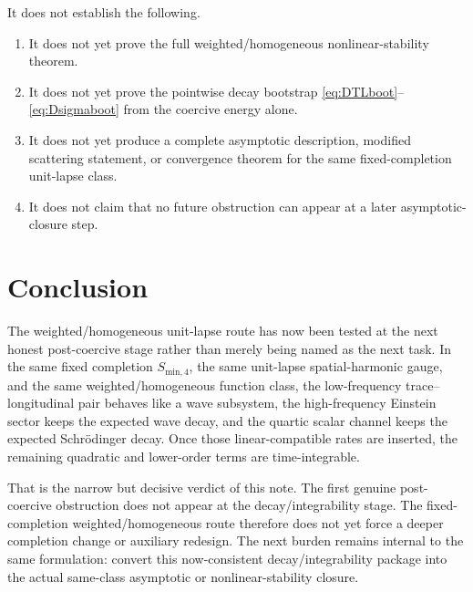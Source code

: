 \documentclass[11pt]{article}
\begin{document}
It does not establish the following.
\begin{enumerate}
    \item It does not yet prove the full weighted/homogeneous nonlinear-stability theorem.
    \item It does not yet prove the pointwise decay bootstrap \eqref{eq:DTLboot}--\eqref{eq:Dsigmaboot} from the coercive energy alone.
    \item It does not yet produce a complete asymptotic description, modified scattering statement, or convergence theorem for the same fixed-completion unit-lapse class.
    \item It does not claim that no future obstruction can appear at a later asymptotic-closure step.
\end{enumerate}

\section{Conclusion}

The weighted/homogeneous unit-lapse route has now been tested at the next honest post-coercive stage rather than merely being named as the next task. In the same fixed completion \(S_{\mathrm{min},4}\), the same unit-lapse spatial-harmonic gauge, and the same weighted/homogeneous function class, the low-frequency trace--longitudinal pair behaves like a wave subsystem, the high-frequency Einstein sector keeps the expected wave decay, and the quartic scalar channel keeps the expected Schr\"odinger decay. Once those linear-compatible rates are inserted, the remaining quadratic and lower-order terms are time-integrable.

That is the narrow but decisive verdict of this note. The first genuine post-coercive obstruction does not appear at the decay/integrability stage. The fixed-completion weighted/homogeneous route therefore does not yet force a deeper completion change or auxiliary redesign. The next burden remains internal to the same formulation: convert this now-consistent decay/integrability package into the actual same-class asymptotic or nonlinear-stability closure.
\end{document}
